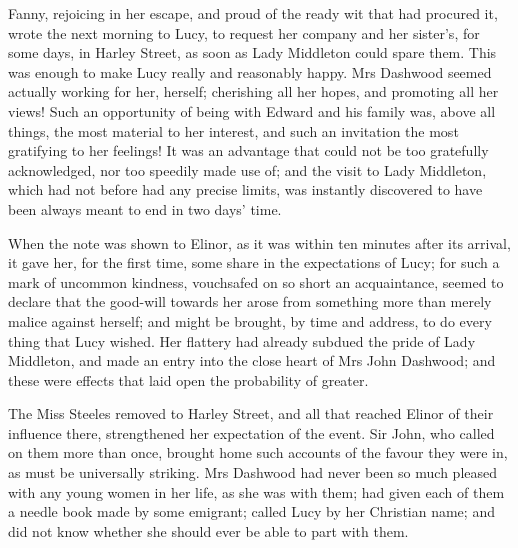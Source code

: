 Fanny, rejoicing in her escape, and proud of the ready wit that had procured it, wrote the next morning to Lucy, to request her company and her sister's, for some days, in Harley Street, as soon as Lady Middleton could spare them. This was enough to make Lucy really and reasonably happy. Mrs Dashwood seemed actually working for her, herself; cherishing all her hopes, and promoting all her views! Such an opportunity of being with Edward and his family was, above all things, the most material to her interest, and such an invitation the most gratifying to her feelings! It was an advantage that could not be too gratefully acknowledged, nor too speedily made use of; and the visit to Lady Middleton, which had not before had any precise limits, was instantly discovered to have been always meant to end in two days' time.

When the note was shown to Elinor, as it was within ten minutes after its arrival, it gave her, for the first time, some share in the expectations of Lucy; for such a mark of uncommon kindness, vouchsafed on so short an acquaintance, seemed to declare that the good-will towards her arose from something more than merely malice against herself; and might be brought, by time and address, to do every thing that Lucy wished. Her flattery had already subdued the pride of Lady Middleton, and made an entry into the close heart of Mrs John Dashwood; and these were effects that laid open the probability of greater.

The Miss Steeles removed to Harley Street, and all that reached Elinor of their influence there, strengthened her expectation of the event. Sir John, who called on them more than once, brought home such accounts of the favour they were in, as must be universally striking. Mrs Dashwood had never been so much pleased with any young women in her life, as she was with them; had given each of them a needle book made by some emigrant; called Lucy by her Christian name; and did not know whether she should ever be able to part with them.